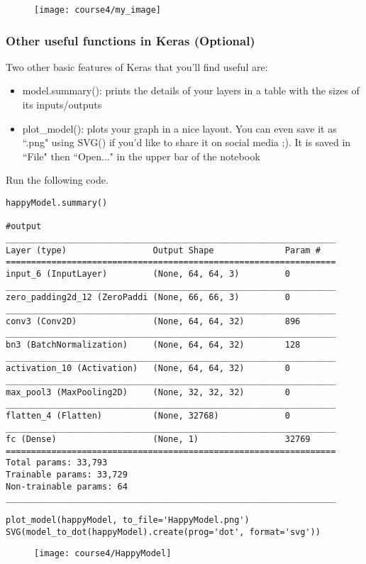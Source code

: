 \begin{figure}[h]
\begin{center}
\texttt{[image: course4/my\_image]}
\end{center}
\end{figure}





\subsubsection{Other useful functions in Keras (Optional)}

Two other basic features of Keras that you'll find useful are:
\begin{itemize}
\item model.summary(): prints the details of your layers in a table with the sizes of its inputs/outputs
\item plot\_model(): plots your graph in a nice layout. You can even save it as ``.png" using SVG() if you'd like to share it on social media ;). It is saved in ``File" then ``Open..." in the upper bar of the notebook
\end{itemize}


Run the following code.
\begin{verbatim}
happyModel.summary()

#output
_________________________________________________________________
Layer (type)                 Output Shape              Param #   
=================================================================
input_6 (InputLayer)         (None, 64, 64, 3)         0         
_________________________________________________________________
zero_padding2d_12 (ZeroPaddi (None, 66, 66, 3)         0         
_________________________________________________________________
conv3 (Conv2D)               (None, 64, 64, 32)        896       
_________________________________________________________________
bn3 (BatchNormalization)     (None, 64, 64, 32)        128       
_________________________________________________________________
activation_10 (Activation)   (None, 64, 64, 32)        0         
_________________________________________________________________
max_pool3 (MaxPooling2D)     (None, 32, 32, 32)        0         
_________________________________________________________________
flatten_4 (Flatten)          (None, 32768)             0         
_________________________________________________________________
fc (Dense)                   (None, 1)                 32769     
=================================================================
Total params: 33,793
Trainable params: 33,729
Non-trainable params: 64
_________________________________________________________________

\end{verbatim}

\clearpage
\begin{verbatim}
plot_model(happyModel, to_file='HappyModel.png')
SVG(model_to_dot(happyModel).create(prog='dot', format='svg'))
\end{verbatim}
\begin{figure}[h]
\begin{center}
\texttt{[image: course4/HappyModel]}
\end{center}
\end{figure}

\clearpage
